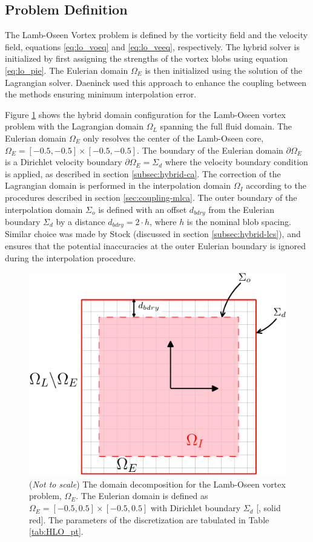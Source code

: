 \subsection{Problem Definition}

The Lamb-Oseen Vortex problem is defined by the vorticity field and the velocity field, equations \ref{eq:lo_voeq} and \ref{eq:lo_veeq}, respectively. The hybrid solver is initialized by first assigning the strengths of the vortex blobs using equation \ref{eq:lo_pie}. The Eulerian domain $\Omega_E$ is then initialized using the solution of the Lagrangian solver. Daeninck \cite{Daeninck2006} used this approach to enhance the coupling between the methods ensuring minimum interpolation error.

Figure \ref{fig:HLO_dc} shows the hybrid domain configuration for the Lamb-Oseen vortex problem with the Lagrangian domain $\Omega_L$ spanning the full fluid domain. The Eulerian domain $\Omega_E$ only resolves the center of the Lamb-Oseen core, $\Omega_E = [-0.5,-0.5] \times [-0.5,-0.5]$. The boundary of the Eulerian domain $\partial \Omega_E$ is a Dirichlet velocity boundary $\partial \Omega_E = \Sigma_d$ where the velocity boundary condition is applied, as described in section \ref{subsec:hybrid-ca}. The correction of the Lagrangian domain is performed in the interpolation domain $\Omega_{I}$ according to the procedures described in section \ref{sec:coupling-mlca}. The outer boundary of the interpolation domain $\Sigma_{o}$ is defined with an offset $d_{bdry}$ from the Eulerian boundary $\Sigma_d$ by a distance $d_{bdry} = 2\cdot h$, where $h$ is the nominal blob spacing. Similar choice was made by Stock \cite{Stock2010a} (discussed in section \ref{subsec:hybrid-lcs}), and ensures that the potential inaccuracies at the outer Eulerian boundary is ignored during the interpolation procedure.

	\begin{figure}[!b]
	\centering
	\includegraphics[width=0.5\linewidth]{./figures/validation/lambOseen/hlo_dd-crop.pdf}
	\caption{(\textit{Not to scale}) The domain decomposition for the Lamb-Oseen vortex problem, $\Omega_E$. The Eulerian domain is defined as $\Omega_E = [-0.5,0.5]\times[-0.5,0.5]$ with Dirichlet boundary $\Sigma_d$ [{\color{plotRed}{---}}, solid red]. The parameters of the discretization are tabulated in Table \ref{tab:HLO_pt}.}
	\label{fig:HLO_dc}
	\end{figure}

